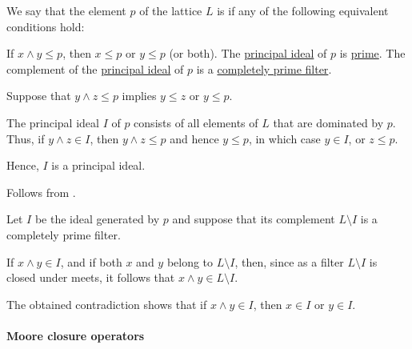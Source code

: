 \begin{definition}\label{def:lattice_prime_element}
  We say that the element \( p \) of the lattice \( L \) is  if any of the following equivalent conditions hold:
  \begin{thmenum}
     If \( x \wedge y \leq p \), then \( x \leq p \) or \( y \leq p \) (or both).
     The \hyperref[def:lattice_ideal/principal]{principal ideal} of \( p \) is \hyperref[def:lattice_ideal/prime]{prime}.
     The complement of the \hyperref[def:lattice_ideal/principal]{principal ideal} of \( p \) is a \hyperref[def:lattice_ideal/prime]{completely prime filter}.
  \end{thmenum}
\end{definition}
\begin{defproof}
   Suppose that \( y \wedge z \leq p \) implies \( y \leq z \) or \( y \leq p \).

  The principal ideal \( I \) of \( p \) consists of all elements of \( L \) that are dominated by \( p \). Thus, if \( y \wedge z \in I \), then \( y \wedge z \leq p \) and hence \( y \leq p \), in which case \( y \in I \), or \( z \leq p \).

  Hence, \( I \) is a principal ideal.

   Follows from .

   Let \( I \) be the ideal generated by \( p \) and suppose that its complement \( L \setminus I \) is a completely prime filter.

  If \( x \wedge y \in I \), and if both \( x \) and \( y \) belong to \( L \setminus I \), then, since as a filter \( L \setminus I \) is closed under meets, it follows that \( x \wedge y \in L \setminus I \).

  The obtained contradiction shows that if \( x \wedge y \in I \), then \( x \in I \) or \( y \in I \).
\end{defproof}

\paragraph{Moore closure operators}

